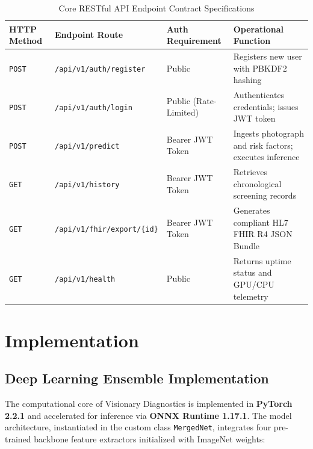 \documentclass[12pt,a4paper,oneside]{report}
\begin{document}
\begin{table}[H]
\centering
\caption{Core RESTful API Endpoint Contract Specifications}
\label{tab:api_endpoints}
\begin{tabularx}{\textwidth}{l l p{3.2cm} X}
\toprule
\textbf{HTTP Method} & \textbf{Endpoint Route} & \textbf{Auth Requirement} & \textbf{Operational Function} \\
\midrule
\texttt{POST} & \texttt{/api/v1/auth/register} & Public & Registers new user with PBKDF2 hashing \\
\texttt{POST} & \texttt{/api/v1/auth/login} & Public (Rate-Limited) & Authenticates credentials; issues JWT token \\
\texttt{POST} & \texttt{/api/v1/predict} & Bearer JWT Token & Ingests photograph and risk factors; executes inference \\
\texttt{GET} & \texttt{/api/v1/history} & Bearer JWT Token & Retrieves chronological screening records \\
\texttt{GET} & \texttt{/api/v1/fhir/export/\{id\}} & Bearer JWT Token & Generates compliant HL7 FHIR R4 JSON Bundle \\
\texttt{GET} & \texttt{/api/v1/health} & Public & Returns uptime status and GPU/CPU telemetry \\
\bottomrule
\end{tabularx}
\end{table}



\chapter{Implementation}
\label{ch:implementation}

\section{Deep Learning Ensemble Implementation}
\label{sec:dl_impl}

The computational core of Visionary Diagnostics is implemented in \textbf{PyTorch 2.2.1} and accelerated for inference via \textbf{ONNX Runtime 1.17.1}. The model architecture, instantiated in the custom class \texttt{MergedNet}, integrates four pre-trained backbone feature extractors initialized with ImageNet weights:
\end{document}
